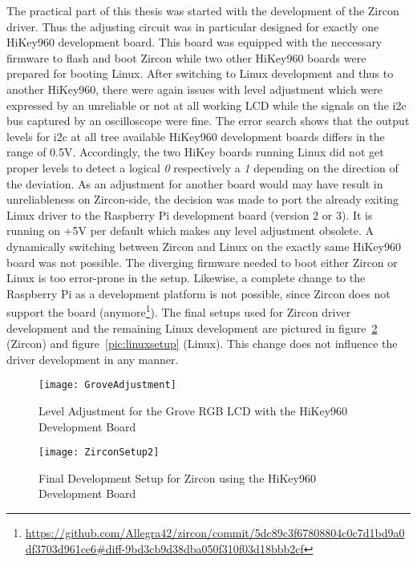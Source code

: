 The practical part of this thesis was started with the development of the Zircon driver.
Thus the adjusting circuit was in particular designed for exactly one HiKey960 development board.
This board was equipped with the neccessary firmware to flash and boot Zircon while two other HiKey960 boards were prepared for booting Linux.
After switching to Linux development and thus to another HiKey960, there were again issues with level adjustment which were expressed by an unreliable or not at all working LCD while the signals on the \ac{i2c} bus captured by an oscilloscope were fine.
The error search shows that the output levels for \ac{i2c} at all tree available HiKey960 development boards differs in the range of 0.5V.
Accordingly, the two HiKey boards running Linux did not get proper levels to detect a logical \textit{0} respectively a \textit{1} depending on the direction of the deviation.
As an adjustment for another board would may have result in unreliableness on Zircon-side, the decision was made to port the already exiting Linux driver to the Raspberry Pi development board (version 2 or 3).
It is running on +5V per default which makes any level adjustment obsolete. 
A dynamically switching between Zircon and Linux on the exactly same HiKey960 board was not possible.
The diverging firmware needed to boot either Zircon or Linux is too error-prone in the setup.
Likewise, a complete change to the Raspberry Pi as a development platform is not possible, since Zircon does not support the board (anymore\footnote{\url{https://github.com/Allegra42/zircon/commit/5dc89c3f67808804c0c7d1bd9a0df3703d961ce6#diff-9bd3cb9d38dba050f310f03d18bbb2cf}}).
The final setups used for Zircon driver development and the remaining Linux development are pictured in figure~\ref{pic:zirconsetup} (Zircon) and figure~\ref{pic:linuxsetup} (Linux).
This change does not influence the driver development in any manner.

\begin{figure} [t]
    \centering
    \texttt{[image: GroveAdjustment]}
    \caption{Level Adjustment for the Grove RGB LCD with the HiKey960 Development Board}\label{pic:groveadjust}
\end{figure} 

\begin{figure} [H]
    \centering
    \texttt{[image: ZirconSetup2]}
    \caption{Final Development Setup for Zircon using the HiKey960 Development Board}\label{pic:zirconsetup}
\end{figure} 

